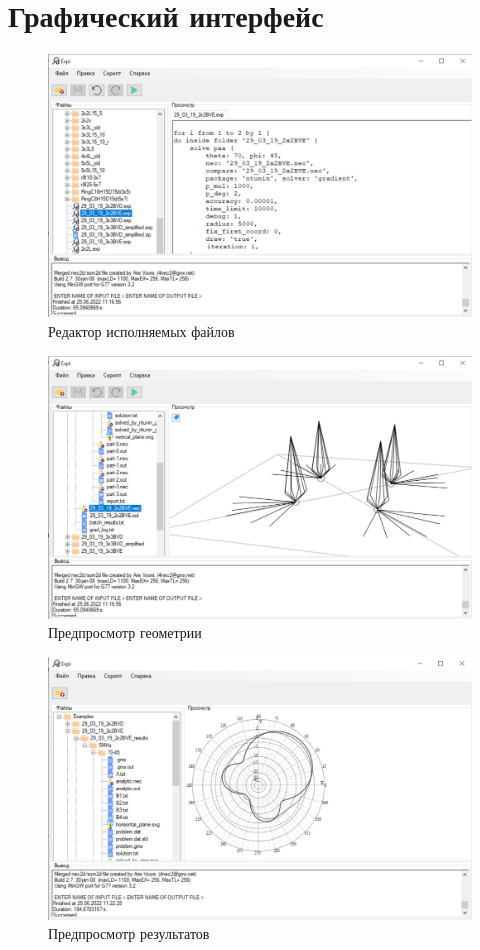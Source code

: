 \documentclass{article}
\begin{document}
\section{Графический интерфейс}

\begin{figure}[H]
  \centering
  \includegraphics[width=\linewidth]{expi_script.jpeg}
  \caption{Редактор исполняемых файлов}
\end{figure}

\begin{figure}[H]
  \centering
  \includegraphics[width=\linewidth]{expi_paa.jpeg}
  \caption{Предпросмотр геометрии}
\end{figure}

\begin{figure}[H]
  \centering
  \includegraphics[width=\linewidth]{expi_results.jpeg}
  \caption{Предпросмотр результатов}
\end{figure}
\end{document}

